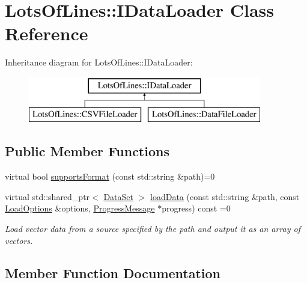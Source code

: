 \hypertarget{class_lots_of_lines_1_1_i_data_loader}{}\section{Lots\+Of\+Lines\+:\+:I\+Data\+Loader Class Reference}
\label{class_lots_of_lines_1_1_i_data_loader}
Inheritance diagram for Lots\+Of\+Lines\+:\+:I\+Data\+Loader\+:\begin{figure}[H]
\begin{center}
\leavevmode
\includegraphics[height=2.000000cm]{class_lots_of_lines_1_1_i_data_loader}
\end{center}
\end{figure}
\subsection*{Public Member Functions}
\begin{DoxyCompactItemize}
\item 
virtual bool \hyperlink{class_lots_of_lines_1_1_i_data_loader_a73f9ee96a55bd6d339d5028f951240f9}{supports\+Format} (const std\+::string \&path)=0
\item 
virtual std\+::shared\+\_\+ptr$<$ \hyperlink{class_lots_of_lines_1_1_data_set}{Data\+Set} $>$ \hyperlink{class_lots_of_lines_1_1_i_data_loader_ad2e836decbe5d96e0ac2ca43a8177881}{load\+Data} (const std\+::string \&path, const \hyperlink{struct_lots_of_lines_1_1_load_options}{Load\+Options} \&options, \hyperlink{class_lots_of_lines_1_1_progress_message}{Progress\+Message} $\ast$progress) const  =0
\begin{DoxyCompactList}\small\item\em Load vector data from a source specified by the path and output it as an array of vectors. \end{DoxyCompactList}\end{DoxyCompactItemize}


\subsection{Member Function Documentation}
